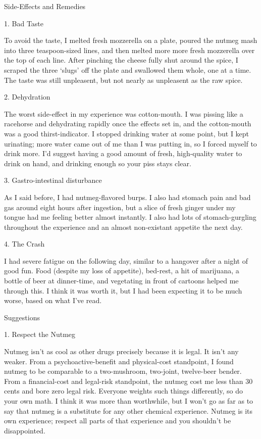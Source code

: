 \documentclass[letterpaper,12pt]{article}
\begin{document}
Side-Effects and Remedies



1.  Bad Taste



To avoid the taste, I melted fresh mozzerella on a plate, poured the nutmeg mash into three teaspoon-sized lines, and then melted more more fresh mozzerella over the top of each line.  After pinching the cheese fully shut around the spice, I scraped the three `slugs' off the plate and swallowed them whole, one at a time.  The taste was still unpleasent, but not nearly as unpleasent as the raw spice.



2.  Dehydration



The worst side-effect in my experience was cotton-mouth.  I was pissing like a racehorse and dehydrating rapidly once the effects set in, and the cotton-mouth was a good thirst-indicator.  I stopped drinking water at some point, but I kept urinating; more water came out of me than I was putting in, so I forced myself to drink more.  I'd suggest having a good amount of fresh, high-quality water to drink on hand, and drinking enough so your piss stays clear.



3.  Gastro-intestinal disturbance



As I said before, I had nutmeg-flavored burps.  I also had stomach pain and bad gas around eight hours after ingestion, but a slice of fresh ginger under my tongue had me feeling better almost instantly.  I also had lots of stomach-gurgling throughout the experience and an almost non-existant appetite the next day.



4.  The Crash



I had severe fatigue on the following day, similar to a hangover after a night of good fun.  Food (despite my loss of appetite), bed-rest, a hit of marijuana, a bottle of beer at dinner-time, and vegetating in front of cartoons helped me through this.  I think it was worth it, but I had been expecting it to be much worse, based on what I've read.



Suggestions



1. Respect the Nutmeg



Nutmeg isn't as cool as other drugs precisely because it is legal.  It isn't any weaker.  From a psychoactive-benefit and physical-cost standpoint, I found nutmeg to be comparable to a two-mushroom, two-joint, twelve-beer bender.  From a financial-cost and legal-risk standpoint, the nutmeg cost me less than 30 cents and bore zero legal risk.  Everyone weights such things differently, so do your own math.  I think it was more than worthwhile, but I won't go as far as to say that nutmeg is a substitute for any other chemical experience.  Nutmeg is its own experience; respect all parts of that experience and you shouldn't be disappointed.
\end{document}
